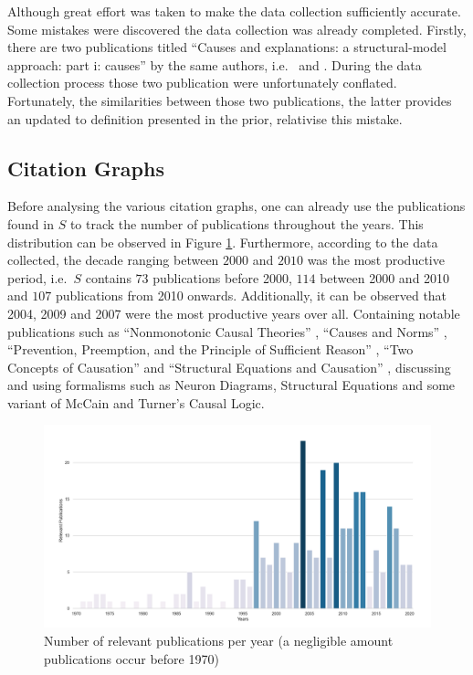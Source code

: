 \documentclass[11pt,a4paper]{book}
\theoremstyle{definition}
\theoremstyle{definition}
\theoremstyle{definition}
\theoremstyle{remark}
\newcommand{\pset}{S}
\begin{document}
Although great effort was taken to make the data collection sufficiently accurate. Some mistakes were discovered the data collection was already completed.
Firstly, there are two publications titled ``Causes and explanations: a structural-model approach: part i: causes'' by the same authors, i.e.\ \parencite{halpern2001causes} and \parencite{halpern2005causes}.
During the data collection process those two publication were unfortunately conflated. Fortunately, the similarities between those two publications, the latter provides an updated to definition presented in the prior, relativise this mistake.





\subsection{Citation Graphs}


Before analysing the various citation graphs, one can already use the publications found in $\pset$ to track the number of publications throughout the years. This distribution can be observed in Figure \ref{fig:pgraph-relevant_publications_per_year}. 
Furthermore, according to the data collected, the decade ranging between $2000$ and $2010$ was the most productive period, i.e.\ $\pset$ contains $73$ publications before 2000, $114$ between 2000 and 2010 and $107$ publications from 2010 onwards. Additionally, it can be observed that 2004, 2009 and 2007 were the most productive years over all. Containing notable publications such as 
``Nonmonotonic Causal Theories'' \parencite{giunchiglia2004nonmonotonic}, ``Causes and Norms'' \parencite{hitchcock2009cause}, ``Prevention, Preemption, and the Principle of Sufficient Reason'' \parencite{hitchcock2007prevention}, ``Two Concepts of Causation'' \parencite{hall2004two} and ``Structural Equations and Causation'' \parencite{hall2007structural}, 
discussing and using formalisms such as Neuron Diagrams, Structural Equations and some variant of McCain and Turner's Causal Logic.


\begin{figure}[h]
\includegraphics[width=\textwidth]{relevant_publications_per_year.png}
\caption{Number of relevant publications per year (a negligible amount publications occur before 1970)}
\label{fig:pgraph-relevant_publications_per_year}
\end{figure}
\end{document}
